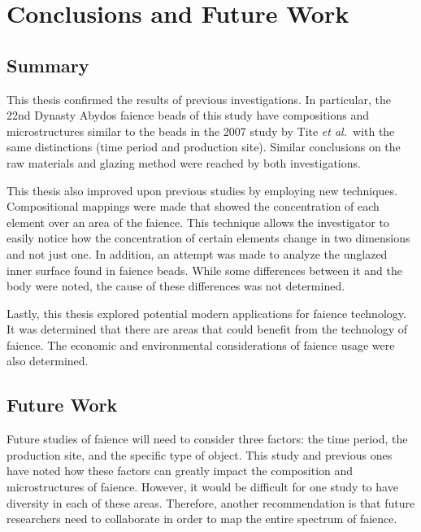 \chapter{Conclusions and Future Work}


\section{Summary}

This thesis confirmed the results of previous investigations. In particular, the 22nd Dynasty Abydos faience beads of this study have compositions and microstructures similar to the beads in the 2007 study by Tite \emph{et al.}\ with the same distinctions (time period and production site). Similar conclusions on the raw materials and glazing method were reached by both investigations.

This thesis also improved upon previous studies by employing new techniques. Compositional mappings were made that showed the concentration of each element over an area of the faience. This technique allows the investigator to easily notice how the concentration of certain elements change in two dimensions and not just one. In addition, an attempt was made to analyze the unglazed inner surface found in faience beads. While some differences between it and the body were noted, the cause of these differences was not determined.

Lastly, this thesis explored potential modern applications for faience technology. It was determined that there are areas that could benefit from the technology of faience. The economic and environmental considerations of faience usage were also determined.


\section{Future Work}

Future studies of faience will need to consider three factors: the time period, the production site, and the specific type of object. This study and previous ones~\cite{vandiver83,vandiver98,tite07} have noted how these factors can greatly impact the composition and microstructures of faience. However, it would be difficult for one study to have diversity in each of these areas. Therefore, another recommendation is that future researchers need to collaborate in order to map the entire spectrum of faience.

